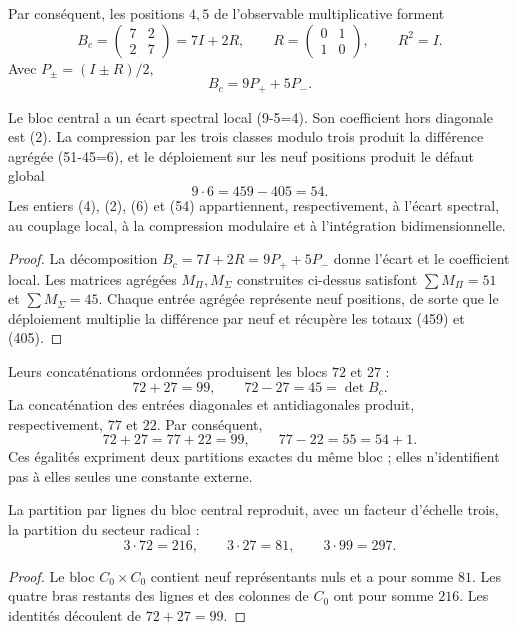 Par conséquent, les positions \(4,5\) de l'observable multiplicative forment
\[
B_c=
\begin{pmatrix}7&2\\2&7\end{pmatrix}
=7I+2R,
\qquad
R=\begin{pmatrix}0&1\\1&0\end{pmatrix},
\qquad R^2=I.
\]
Avec \(P_\pm=(I\pm R)/2\),
\[
B_c=9P_++5P_-.
\]
\begin{theorem}
\label{thm:app-jerarquia-cuatro-dos-seis-cincuentaycuatro}
Le bloc central a un écart spectral local (9-5=4). Son coefficient
hors diagonale est (2). La compression par les trois classes modulo trois
produit la différence agrégée (51-45=6), et le déploiement sur les neuf
positions produit le défaut global
\[
 9\cdot6=459-405=54.
\]
Les entiers (4), (2), (6) et (54) appartiennent, respectivement, à
l'écart spectral, au couplage local, à la compression modulaire et à
l'intégration bidimensionnelle.
\end{theorem}

\begin{proof}
La décomposition \(B_c=7I+2R=9P_++5P_-\) donne l'écart et le
coefficient local. Les matrices agrégées \(M_\Pi,M_\Sigma\) construites
ci-dessus satisfont
\(\sum M_\Pi=51\) et \(\sum M_\Sigma=45\). Chaque entrée agrégée représente
neuf positions, de sorte que le déploiement multiplie la différence par
neuf et récupère les totaux (459) et (405).
\end{proof}
Leurs concaténations ordonnées produisent les blocs \(72\) et \(27\) :
\[
72+27=99,
\qquad
72-27=45=\det B_c.
\]
La concaténation des entrées diagonales et antidiagonales produit,
respectivement, \(77\) et \(22\). Par conséquent,
\[
 72+27=77+22=99,\qquad
 77-22=55=54+1.
\]
Ces égalités expriment deux partitions exactes du même bloc ; elles
n'identifient pas à elles seules une constante externe.

\begin{proposition}
\label{prop:app-local-global-radical}
La partition par lignes du bloc central reproduit, avec un facteur d'échelle
trois, la partition du secteur radical :
\[
 3\cdot72=216,\qquad
 3\cdot27=81,\qquad
 3\cdot99=297.
\]
\end{proposition}

\begin{proof}
Le bloc \(C_0\times C_0\) contient neuf représentants nuls et a pour somme
\(81\). Les quatre bras restants des lignes et des colonnes de \(C_0\)
ont pour somme \(216\). Les identités découlent de \(72+27=99\).
\end{proof}


